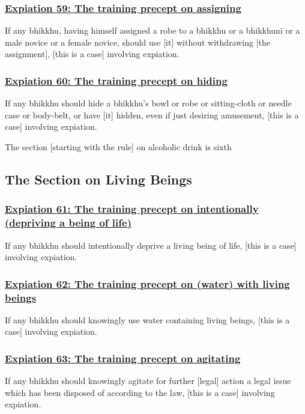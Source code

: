 \subsubsection*{\hyperref[pac59]{Expiation 59: The training precept on assigning}}
\label{exp59}
If any bhikkhu, having himself assigned a robe to a bhikkhu or a bhikkhunī or a male novice or a female novice, should use [it] without withdrawing [the assignment], [this is a case] involving expiation.

\subsubsection*{\hyperref[pac60]{Expiation 60: The training precept on hiding}}
\label{exp60}
If any bhikkhu should hide a bhikkhu's bowl or robe or sitting-cloth or needle case or body-belt, or have [it] hidden, even if just desiring amusement, [this is a case] involving expiation.

\begin{center}
  The section [starting with the rule] on alcoholic drink is sixth
\end{center}

\setsubsecheadstyle{\subsectionFmt}
\subsection{The Section on Living Beings}
\vspace{0.2cm}

\subsubsection*{\hyperref[pac61]{Expiation 61: The training precept on intentionally (depriving a being of life)}}
\label{exp61}
If any bhikkhu should intentionally deprive a living being of life, [this is a case] involving expiation.

\subsubsection*{\hyperref[pac62]{Expiation 62: The training precept on (water) with living beings}}
\label{exp62}
If any bhikkhu should knowingly use water containing living beings, [this is a case] involving expiation.

\subsubsection*{\hyperref[pac63]{Expiation 63: The training precept on agitating}}
\label{exp63}
If any bhikkhu should knowingly agitate for further [legal] action a legal issue which has been disposed of according to the law, [this is a case] involving expiation.

